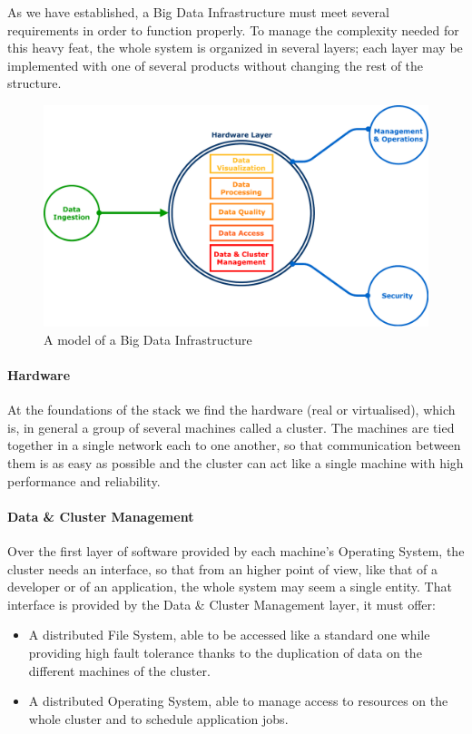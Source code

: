 As we have established, a Big Data Infrastructure must meet several requirements in order to function properly. 
To manage the complexity needed for this heavy feat, the whole system is organized in several layers; each layer may be implemented with one of several products without changing the rest of the structure.

\begin{figure}
	\centering
	\includegraphics[scale=0.6]{Figures/stack_infrastructure}
	\decoRule
	\caption[Infrastructural Stack]{A model of a Big Data Infrastructure}
	\label{fig:InfrastructuralStack}
\end{figure}

\paragraph{Hardware}

At the foundations of the stack we find the hardware (real or virtualised), which is, in general a group of several machines called a cluster.\newline
The machines are tied together in a single network each to one another, so that communication between them is as easy as possible and the cluster can act like a single machine with high performance and reliability.

\paragraph{Data \& Cluster Management}

Over the first layer of software provided by each machine's Operating System, the cluster needs an interface, so that from an higher point of view, like that of a developer or of an application, the whole system may seem a single entity. \newline
That interface is provided by the Data \& Cluster Management layer, it must offer: 
\begin{itemize}
	\item A distributed File System, able to be accessed like a standard one while providing high fault tolerance thanks to the duplication of data on the different machines of the cluster.
	\item A distributed Operating System, able to manage access to resources on the whole cluster and to schedule application jobs.
\end{itemize}

